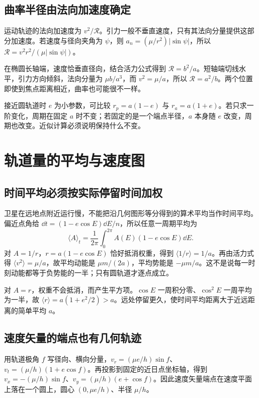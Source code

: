 \subsection{曲率半径由法向加速度确定}

运动轨迹的法向加速度为 $v^2/\mathcal R$。引力一般不垂直速度，只有其法向分量提供这部分加速度。若速度与径向夹角为 $\psi$，则 $a_n=(\mu/r^2)|\sin\psi|$，所以 $\mathcal R=v^2r^2/(\mu|\sin\psi|)$。

在椭圆长轴端，速度恰垂直径向，结合活力公式得到 $\mathcal R=b^2/a$。短轴端切线水平，引力方向倾斜，法向分量为 $\mu b/a^3$，而 $v^2=\mu/a$，所以 $\mathcal R=a^2/b$。两个位置即使到焦点距离相近，曲率也可能很不一样。

接近圆轨道时 $e$ 为小参数，可比较 $r_p=a(1-e)$ 与 $r_a=a(1+e)$。若只求一阶变化，周期在固定 $a$ 时不变；若固定的是一个端点半径，$a$ 本身随 $e$ 改变，周期也改变。近似计算必须说明保持什么不变。


\section{轨道量的平均与速度图}
\subsection{时间平均必须按实际停留时间加权}

  卫星在远地点附近运行慢，不能把沿几何图形等分得到的算术平均当作时间平均。偏近点角给 $\dd t=(1-e\cos E)\dd E/n$，所以任意一周期平均为
  \[\langle A\rangle_t=\frac1{2\pi}\int_0^{2\pi}A(E)(1-e\cos E)\dd E.\]
  对 $A=1/r$，$r=a(1-e\cos E)$ 恰好抵消权重，得到 $\langle1/r\rangle=1/a$。再由活力式得 $\langle v^2\rangle=\mu/a$，故平均动能是 $\mu m/(2a)$，平均势能是 $-\mu m/a$。这不是说每一时刻动能都等于负势能的一半；只有圆轨道才逐点成立。

  对 $A=r$，权重不会抵消，而产生平方项。$\cos E$ 一周积分零、$\cos^2E$ 一周平均为一半，故 $\langle r\rangle=a(1+e^2/2)>a$。远处停留更久，使时间平均距离大于近远距离的简单平均 $a$。
  
\subsection{速度矢量的端点也有几何轨迹}

  用轨道极角 $f$ 写径向、横向分量，$v_r=(\mu e/h)\sin f$、$v_t=(\mu/h)(1+e\cos f)$。再投影到固定的近日点坐标轴，得到 $v_x=-(\mu/h)\sin f$、$v_y=(\mu/h)(e+\cos f)$。因此速度矢量端点在速度平面上落在一个圆上，圆心 $(0,\mu e/h)$、半径 $\mu/h$。

